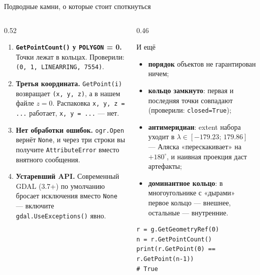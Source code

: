\documentclass[aspectratio=169,10pt]{beamer}
\begin{document}
\begin{frame}[fragile]{Подводные камни, о которые стоит споткнуться}
\footnotesize
\begin{columns}[T,onlytextwidth]
  \begin{column}{0.52\textwidth}
    \begin{enumerate}\itemsep1pt
      \item \textbf{\texttt{GetPointCount()} у \texttt{POLYGON} = 0.}
            Точки лежат в кольцах. Проверили:
            \texttt{(0, 1, LINEARRING, 7554)}.
      \item \textbf{Третья координата.} \texttt{GetPoint(i)} возвращает
            \texttt{(x, y, z)}, а в нашем файле $z = 0$. Распаковка
            \texttt{x, y, z = ...} работает, \texttt{x, y = ...} --- нет.
      \item \textbf{Нет обработки ошибок.} \texttt{ogr.Open} вернёт
            \texttt{None}, и через три строки вы получите
            \texttt{AttributeError} вместо внятного сообщения.
      \item \textbf{Устаревший API.} Современный GDAL (3.7+) по умолчанию
            бросает исключения вместо \texttt{None} --- включите
            \texttt{gdal.UseExceptions()} явно.
    \end{enumerate}
  \end{column}
  \begin{column}{0.46\textwidth}
    \begin{alertblock}{И ещё}\small
      \begin{itemize}\itemsep1pt
        \item \textbf{порядок} объектов не гарантирован ничем;
        \item \textbf{кольцо замкнуто}: первая и последняя точки совпадают
              (проверили: \texttt{closed=True});
        \item \textbf{антимеридиан}: extent набора уходит в
              $\lambda\in[-179.23;\,179.86]$ --- Аляска «перескакивает»
              на $+180^\circ$, и наивная проекция даст артефакты;
        \item \textbf{доминантное кольцо}: в многоугольнике с «дырами»
              первое кольцо --- внешнее, остальные --- внутренние.
      \end{itemize}
    \end{alertblock}
    \vspace{0.2em}
    \begin{Verbatim}[fontsize=\tiny,numbers=none]
r = g.GetGeometryRef(0)
n = r.GetPointCount()
print(r.GetPoint(0) == r.GetPoint(n-1))
# True
\end{Verbatim}
  \end{column}
\end{columns}
\end{frame}
\end{document}
